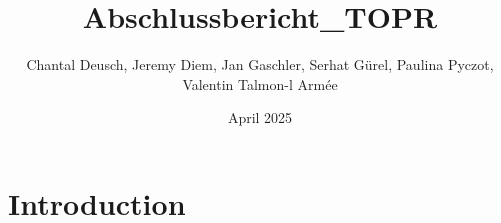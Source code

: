 \documentclass{article}
\title{Abschlussbericht_TOPR}
\author{Chantal Deusch, Jeremy Diem, Jan Gaschler, Serhat Gürel, Paulina Pyczot, Valentin Talmon-l Armée}
\date{April 2025}
\begin{document}
\maketitle

\section{Introduction}
\end{document}
